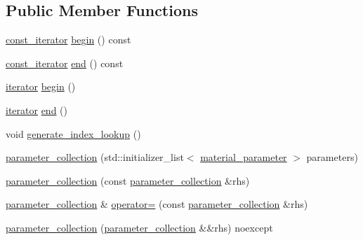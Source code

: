 \subsection*{Public Member Functions}
\begin{DoxyCompactItemize}
\item 
\mbox{\hyperlink{classmoka_1_1parameter__collection_a6d2ad87d4e43742300cb9ded3beee731}{const\+\_\+iterator}} \mbox{\hyperlink{classmoka_1_1parameter__collection_a0dad35309be55314f72215c04fff209b}{begin}} () const
\item 
\mbox{\hyperlink{classmoka_1_1parameter__collection_a6d2ad87d4e43742300cb9ded3beee731}{const\+\_\+iterator}} \mbox{\hyperlink{classmoka_1_1parameter__collection_a8fb5d245c9f90146b866ed0128eb693b}{end}} () const
\item 
\mbox{\hyperlink{classmoka_1_1parameter__collection_a2ec8bed3c1d7de9e5c2199ede27aa919}{iterator}} \mbox{\hyperlink{classmoka_1_1parameter__collection_a5bd7e953bcc4a075aea8299b16f9f40a}{begin}} ()
\item 
\mbox{\hyperlink{classmoka_1_1parameter__collection_a2ec8bed3c1d7de9e5c2199ede27aa919}{iterator}} \mbox{\hyperlink{classmoka_1_1parameter__collection_a3f4a4ceed264f9fcb280be268f471323}{end}} ()
\item 
void \mbox{\hyperlink{classmoka_1_1parameter__collection_ae8bf8ef669a0542baae8693c2daebe2f}{generate\+\_\+index\+\_\+lookup}} ()
\item 
\mbox{\hyperlink{classmoka_1_1parameter__collection_a09e421cbc4ecbd317341c1e7625bc24e}{parameter\+\_\+collection}} (std\+::initializer\+\_\+list$<$ \mbox{\hyperlink{structmoka_1_1material__parameter}{material\+\_\+parameter}} $>$ parameters)
\item 
\mbox{\hyperlink{classmoka_1_1parameter__collection_ae260d9fd4479a2e25b838bff6e8d1e0d}{parameter\+\_\+collection}} (const \mbox{\hyperlink{classmoka_1_1parameter__collection}{parameter\+\_\+collection}} \&rhs)
\item 
\mbox{\hyperlink{classmoka_1_1parameter__collection}{parameter\+\_\+collection}} \& \mbox{\hyperlink{classmoka_1_1parameter__collection_afe67eefd0d63d71999b9451ebf95c564}{operator=}} (const \mbox{\hyperlink{classmoka_1_1parameter__collection}{parameter\+\_\+collection}} \&rhs)
\item 
\mbox{\hyperlink{classmoka_1_1parameter__collection_a1d3e96c869b3a52dd757216cea4d5c1b}{parameter\+\_\+collection}} (\mbox{\hyperlink{classmoka_1_1parameter__collection}{parameter\+\_\+collection}} \&\&rhs) noexcept
\item 

\end{DoxyCompactItemize}

